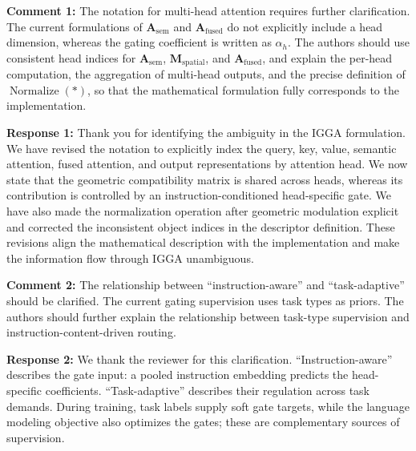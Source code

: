 

{\noindent\color{comment}
\textbf{Comment 1:}
The notation for multi-head attention requires further clarification. The current formulations of $\mathbf{A}_{\mathrm{sem}}$ and $\mathbf{A}_{\mathrm{fused}}$ do not explicitly include a head dimension, whereas the gating coefficient is written as $\alpha_h$. The authors should use consistent head indices for $\mathbf{A}_{\mathrm{sem}}$, $\mathbf{M}_{\mathrm{spatial}}$, and $\mathbf{A}_{\mathrm{fused}}$, and explain the per-head computation, the aggregation of multi-head outputs, and the precise definition of $\operatorname{Normalize}(\ast)$, so that the mathematical formulation fully corresponds to the implementation.
}\vspace{\comafter}

\noindent\textbf{Response 1:}
Thank you for identifying the ambiguity in the IGGA formulation. We have revised the notation to explicitly index the query, key, value, semantic attention, fused attention, and output representations by attention head. We now state that the geometric compatibility matrix is shared across heads, whereas its contribution is controlled by an instruction-conditioned head-specific gate. We have also made the normalization operation after geometric modulation explicit and corrected the inconsistent object indices in the descriptor definition. These revisions align the mathematical description with the implementation and make the information flow through IGGA unambiguous.
\vspace{\resafter}


{\noindent\color{comment}
\textbf{Comment 2:}
The relationship between ``instruction-aware'' and ``task-adaptive'' should be clarified. The current gating supervision uses task types as priors. The authors should further explain the relationship between task-type supervision and instruction-content-driven routing.
}\vspace{\comafter}

\noindent\textbf{Response 2:}
We thank the reviewer for this clarification. ``Instruction-aware'' describes the gate input: a pooled instruction embedding predicts the head-specific coefficients. ``Task-adaptive'' describes their regulation across task demands. During training, task labels supply soft gate targets, while the language modeling objective also optimizes the gates; these are complementary sources of supervision.

